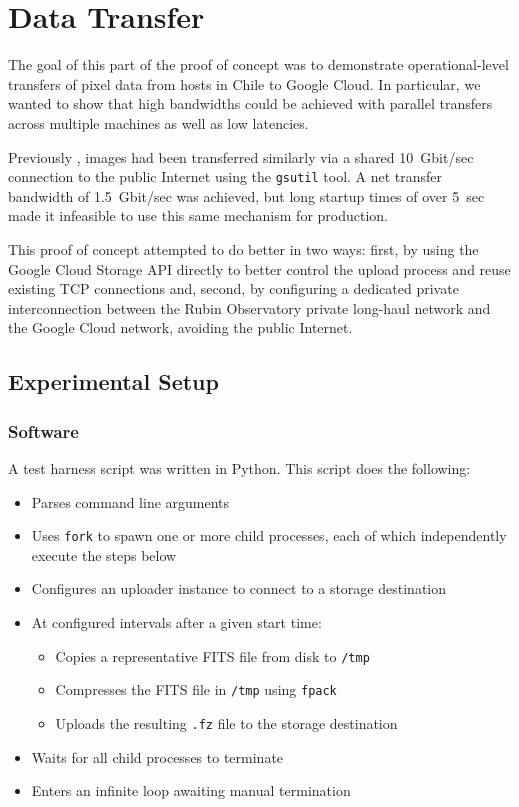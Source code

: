 \section{Data Transfer}\label{sec:dataxfer}

The goal of this part of the proof of concept was to demonstrate operational-level transfers of pixel data from hosts in Chile to Google Cloud.
In particular, we wanted to show that high bandwidths could be achieved with parallel transfers across multiple machines as well as low latencies.

Previously \citep{DMTN-125}, images had been transferred similarly via a shared 10~Gbit/sec connection to the public Internet using the \texttt{gsutil} tool.
A net transfer bandwidth of 1.5~Gbit/sec was achieved, but long startup times of over 5~sec made it infeasible to use this same mechanism for production.

This proof of concept attempted to do better in two ways: first, by using the Google Cloud Storage API directly to better control the upload process and reuse existing TCP connections and, second, by configuring a dedicated private interconnection between the Rubin Observatory private long-haul network and the Google Cloud network, avoiding the public Internet.

\subsection{Experimental Setup}

\subsubsection{Software}

A test harness script was written in Python.
This script does the following:
\begin{itemize}
\item Parses command line arguments
\item Uses \texttt{fork} to spawn one or more child processes, each of which independently execute the steps below
\item Configures an uploader instance to connect to a storage destination
\item At configured intervals after a given start time:
  \begin{itemize}
  \item Copies a representative FITS file from disk to \texttt{/tmp}
  \item Compresses the FITS file in \texttt{/tmp} using \texttt{fpack}
  \item Uploads the resulting \texttt{.fz} file to the storage destination
  \end{itemize}
\item Waits for all child processes to terminate
\item Enters an infinite loop awaiting manual termination
\end{itemize}

